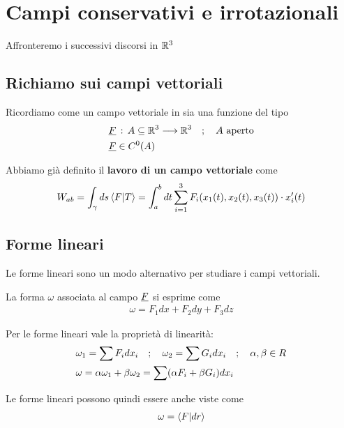 \chapter{Campi conservativi e irrotazionali}

Affronteremo i successivi discorsi in $\mathbb{R}^3$

\section{Richiamo sui campi vettoriali}

Ricordiamo come un campo vettoriale in  sia una funzione del tipo
\begin{align}
	{}&\underline{F} \, : \, A\subseteq \mathbb{R}^{3} \longrightarrow \mathbb{R}^{3} \quad ; \quad A \text{ aperto}\\
	&\underline{F}\in C^0(A)
\end{align}

Abbiamo già definito il \textbf{lavoro di un campo vettoriale} come
\begin{align}
	W_{ab}= \int_{\gamma} ds \braket{F|T}= \int_{a}^{b} dt \sum_{i=1}^{3}F_i(x_1(t),x_2(t),x_3(t)) \cdot x'_i(t)
\end{align}

\section{Forme lineari}

Le forme lineari sono un modo alternativo per studiare i campi vettoriali. 

La forma $\omega$ associata al campo $\underline{F}$ si esprime come
\begin{align}
	\omega = F_1 dx + F_2 dy + F_3 dz
\end{align}

Per le forme lineari vale la proprietà di linearità:
\begin{align}
	{}&\omega_1 = \sum F_i dx_i \quad ; \quad \omega_2 = \sum G_i dx_i \quad ; \quad \alpha , \beta \in R\\
	&\omega = \alpha \omega_1 + \beta \omega_2 = \sum (\alpha F_i + \beta G_i)dx_i
\end{align}

Le forme lineari possono quindi essere anche viste come
\begin{align}
	\omega = \braket{F|dr}
\end{align}


